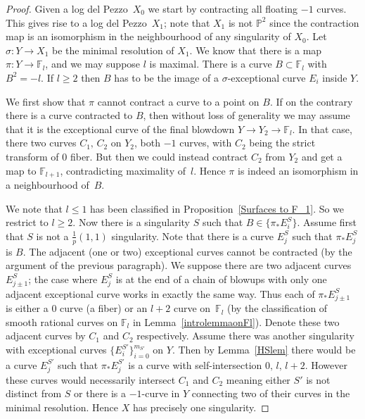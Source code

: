 \documentclass[12pt]{amsbook}
\theoremstyle{plain}
\newcommand{\ldp}{log del Pezzo}
\newcommand{\mb}[1]{\mathbb{#1}}
\newcommand{\F}{\mathbb{F}}
\renewcommand{\P}{\mathbb{P}}
\begin{document}
\begin{proof}
Given a \ldp\ $X_0$ we start by contracting all floating $-1$ curves. This gives rise to a \ldp\ $X_1$; note that $X_1$ is not $\P^2$ since the contraction map is an isomorphism in the neighbourhood of any singularity of $X_0$. Let $\sigma\colon Y\rightarrow X_1$ be the minimal resolution of $X_1$. We know that there is a map $\pi \colon Y \rightarrow \mathbb{F}_l$, and we may suppose $l$ is maximal.
There is a curve $B \subset \mathbb{F}_l$ with $B^2 = -l$. 
If $l\ge2$ then $B$ has to be the image of a $\sigma$-exceptional curve $E_i$ inside $Y$.

We first show that $\pi$ cannot contract a curve to a point on $B$.
If on the contrary there is a curve contracted to $B$, then
without loss of generality we may assume that it is the exceptional curve of the final blowdown $Y\rightarrow Y_2\rightarrow\F_l$. In that case, there two curves $C_1, \, C_2$ on $Y_2$, both $-1$ curves, with $C_2$ being the strict transform of $0$ fiber. But then we could instead contract $C_2$ from $Y_2$ and get a map to $\mb{F}_{l+1}$, contradicting maximality of~$l$. 
Hence $\pi$ is indeed an isomorphism in a neighbourhood of~$B$.


We note that  $l \leq 1$ has been classified in Proposition~\ref{Surfaces to F_1}. So we restrict to $l \geq 2$. Now there is a singularity $S$ such that $B \in \{ \pi_*E_i^S \}$. Assume first that $S$ is not a $\frac{1}{p}(1,1)$ singularity. Note that there is a curve $E_j^S$ such that $\pi_* E_j^S$ is $B$. The adjacent (one or two) exceptional curves cannot be contracted (by the argument of the previous paragraph). We suppose there are two adjacent curves $E_{j\pm 1}^S$; the case where $E_j^S$ is at the end of a chain of blowups with only one adjacent exceptional curve works in exactly the same way. Thus each of $\pi_*E_{j\pm 1}^S$ is either a $0$ curve (a fiber) or an $l+2$ curve on~$\F_l$ (by the classification of smooth rational curves on $\F_l$ in Lemma~\ref{introlemmaonFl}).
Denote these two adjacent curves by $C_1$ and $C_2$ respectively. Assume there was another singularity with exceptional curves $\{ E_i^{S'} \}_{i=0}^{m_{S'}} $ on $Y$. Then by Lemma~\ref{HSlem} there would be a curve $E_j^{S'}$ such that $\pi_* E_j^{S'}$ is a curve with self-intersection $0, \,  l,\,  l+2$. However these curves would necessarily intersect $C_1$ and $C_2$ meaning either $S'$ is not distinct from $S$ or there is a $-1$-curve in $Y$ connecting two of their curves in the minimal resolution. Hence $X$ has precisely one singularity. 


\end{proof}
\end{document}

